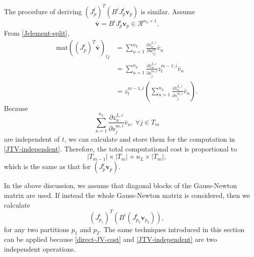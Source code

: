 \documentclass[12pt]{article}
\newcounter{bar}
\def\bv{{\boldsymbol v}}
\begin{document}
\par The procedure of deriving $(J^i_p)^T (B^i J_p^i \bv_p)$ is similar. Assume 
\begin{equation*}
\bar{\bv} = B^i J_p^i \bv_p \in \mathcal R^{n_L \times 1}. 
\end{equation*}
From \eqref{Jelement-split},
\begin{align}
\text{mat}\left((J^i_p)^T \bar{\bv}\right)_{tj} &= \sum_{u=1}^{n_L} \frac{\partial z^{L,i}_u}{\partial w^m_{tj}} \bar{v}_{u} \nonumber\\
							 &= \sum_{u=1}^{n_L} \frac{\partial z^{L,i}_u}{\partial s^{m,i}_{j}} z^{m-1,i}_t \bar{v}_{u} \nonumber\\ 
							 &= z^{m-1,i}_t \left( \sum_{u=1}^{n_L} \frac{\partial z^{L,i}_u}{\partial s^{m,i}_{j}} \bar{v}_{u}\right). \label{JTV-independent} 
\end{align}
Because 
\begin{equation}
\label{JTv}
\sum_{u=1}^{n_L} \frac{\partial z^{L,i}_u}{\partial s^{m,i}_{j}} \bar{v}_{u},\ \forall j \in T_m
\end{equation}
are independent of $t$, we can calculate and store them for the computation in \eqref{JTV-independent}.
Therefore, the total computational cost is proportional to
\begin{equation}
\label{JTv-comp-cost}
|T_{m-1}| \times |T_{m}| + n_L \times |T_m|,
\end{equation}
which is the same as that for $(J^i_p \bv_p)$.
\par In the above discussion, we assume that diagonal blocks of the Gauss-Newton matrix are used. If instead the whole Gauss-Newton matrix
is considered, then we calculate
\begin{equation*}
(J^i_{p_1})^T(B^i(J^i_{p_2} \bv_{p_2})),
\end{equation*}
for any two partitions $p_1$ and $p_2$. The same techniques introduced 
in this section can be applied because \eqref{direct-JV-cost} and \eqref{JTV-independent} are two independent operations.
\end{document}
